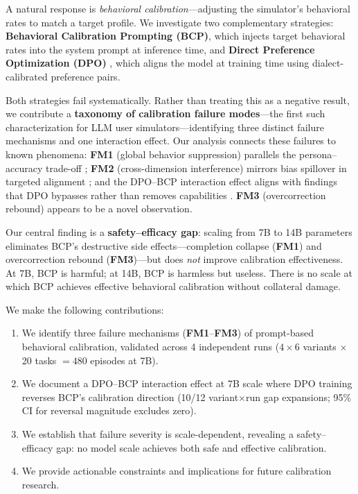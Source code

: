 \documentclass[11pt]{article}
\newcommand{\fm}[1]{\textbf{FM#1}}
\begin{document}
A natural response is \emph{behavioral calibration}---adjusting the simulator's behavioral rates to match a target profile. We investigate two complementary strategies: \textbf{Behavioral Calibration Prompting (BCP)}, which injects target behavioral rates into the system prompt at inference time, and \textbf{Direct Preference Optimization (DPO)} \citep{rafailov2023dpo}, which aligns the model at training time using dialect-calibrated preference pairs.

Both strategies fail systematically. Rather than treating this as a negative result, we contribute a \textbf{taxonomy of calibration failure modes}---the first such characterization for LLM user simulators---identifying three distinct failure mechanisms and one interaction effect. Our analysis connects these failures to known phenomena: \fm{1} (global behavior suppression) parallels the persona--accuracy trade-off \citep{basil2025playing_pretend, hu2026expert_persona}; \fm{2} (cross-dimension interference) mirrors bias spillover in targeted alignment \citep{gupta2026intra_fairness}; and the DPO--BCP interaction effect aligns with findings that DPO bypasses rather than removes capabilities \citep{lee2024dpo_toxicity}. \fm{3} (overcorrection rebound) appears to be a novel observation.

Our central finding is a \textbf{safety--efficacy gap}: scaling from 7B to 14B parameters eliminates BCP's destructive side effects---completion collapse (\fm{1}) and overcorrection rebound (\fm{3})---but does \emph{not} improve calibration effectiveness. At 7B, BCP is harmful; at 14B, BCP is harmless but useless. There is no scale at which BCP achieves effective behavioral calibration without collateral damage.

We make the following contributions:
\begin{enumerate}
    \item We identify three failure mechanisms (\fm{1}--\fm{3}) of prompt-based behavioral calibration, validated across 4 independent runs ($4 \times 6$ variants $\times$ 20 tasks $= 480$ episodes at 7B).
    \item We document a DPO--BCP interaction effect at 7B scale where DPO training reverses BCP's calibration direction (10/12 variant$\times$run gap expansions; 95\% CI for reversal magnitude excludes zero).
    \item We establish that failure severity is scale-dependent, revealing a safety--efficacy gap: no model scale achieves both safe and effective calibration.
    \item We provide actionable constraints and implications for future calibration research.
\end{enumerate}
\end{document}
